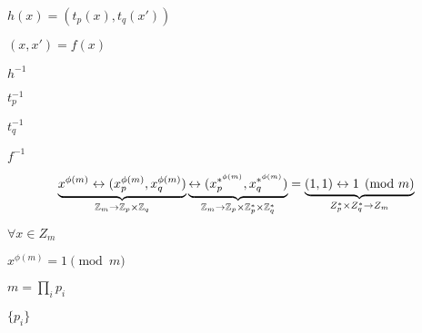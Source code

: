 \documentclass[10pt]{book}
\begin{document}
\begin{mdSnippets}
\begin{mdInlineSnippet}[2e2254704d50051e5d170809b514012c]%
$h(x) = (t_p(x), t_q(x'))$\end{mdInlineSnippet}%
\begin{mdInlineSnippet}[4991f03ef412bbe3b423166ec4717ed4]%
$(x,x') = f(x)$\end{mdInlineSnippet}%
\begin{mdInlineSnippet}%
$h^{-1}$\end{mdInlineSnippet}%
\begin{mdInlineSnippet}%
$t_p^{-1}$\end{mdInlineSnippet}%
\begin{mdInlineSnippet}[0eabe19a58c98635b23ca2a83b3bb4a8]%
$t_q^{-1}$\end{mdInlineSnippet}%
\begin{mdInlineSnippet}[e55e328349414752113c4878dc62303f]%
$f^{-1}$\end{mdInlineSnippet}%
\begin{mdDisplaySnippet}[56a6cd6cd5387212c1e93809a1f6320a]%
\[%
\underbrace{x^{\phi(m)} \leftrightarrow (x_p^{\phi(m)}, x_q^{\phi(m)})}_{\Z_m \to \Z_p \times \Z_q} \underbrace{\leftrightarrow (x_p^{*^{\phi(m)}}, x_q^{*^{\phi(m)}})}_{\Z_m \to \Z_p \times \Z_p^* \times \Z_q^*} = \underbrace{(1,1) \leftrightarrow 1 \pmod{m}}_{Z_p^* \times Z_q^* \to Z_m}
\]%
\end{mdDisplaySnippet}%
\begin{mdInlineSnippet}[3e7e28fc05e2c3ceaa6c129bc33d7429]%
$\forall x \in Z_m$\end{mdInlineSnippet}%
\begin{mdInlineSnippet}%
$x^{\phi(m)} = 1 \pmod{m}$\end{mdInlineSnippet}%
\begin{mdInlineSnippet}[0871ebd85d6530532817a0fc0c79af36]%
$m = \prod_i p_i$\end{mdInlineSnippet}%
\begin{mdInlineSnippet}[1e53541040158ce823175a992e94b3d1]%
$\{p_i\}$\end{mdInlineSnippet}%
\begin{mdInlineSnippet}[6f284faa09a0265cb9ba50b26d571aa5]%

\end{mdInlineSnippet}
\end{mdSnippets}
\end{document}
